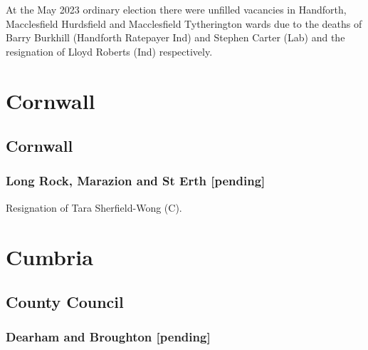\documentclass[a4paper,openany]{book}
\begin{document}
\begin{resultsiii}
At the May 2023 ordinary election there were unfilled vacancies in Handforth, Macclesfield Hurdsfield and Macclesfield Tytherington wards due to the deaths of Barry Burkhill (Handforth Ratepayer Ind) and Stephen Carter (Lab) and the resignation of Lloyd Roberts (Ind) respectively.%

\section{Cornwall}

\subsection*{Cornwall}

\subsubsection*{Long Rock, Marazion and St Erth \hspace*{\fill}\nolinebreak[1]%
	\enspace\hspace*{\fill}
	[pending]}


Resignation of Tara Sherfield-Wong (C).

\section{Cumbria}

\subsection*{County Council}

\subsubsection*{Dearham and Broughton \hspace*{\fill}\nolinebreak[1]%
	\enspace\hspace*{\fill}
	[pending]}



\end{resultsiii}
\end{document}
